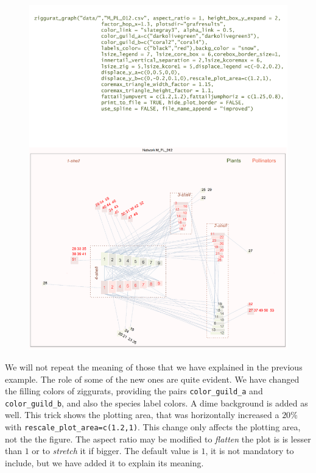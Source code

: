 \documentclass[11pt]{article}
\begin{document}
\clearpage
\begin{figure}[hbt!]
\centering
\includegraphics[scale=0.75]{M_PL_012_ziggurat_improved.pdf}
\label{fig:KMAN_ziggurat_012_improved}
\end{figure}

\clearpage
We will not repeat the meaning of those that we have explained in the previous example. The role of some of the new ones are quite
evident. We have changed the filling colors of ziggurats, providing the pairs \texttt{color\_guild\_a} and \texttt{color\_guild\_b},
and also the species label colors. A dime background is added as well. This trick shows the plotting area, that was horizontally increased
a $20\%$ with \texttt{rescale\_plot\_area=c(1.2,1)}. This change only affects the plotting area, not the the figure. The aspect ratio may
be modified to \textit{flatten} the plot is is lesser than $1$ or to \textit{stretch} it if bigger. The default value is $1$, it is not mandatory
to include, but we have added it to explain its meaning.
\end{document}
